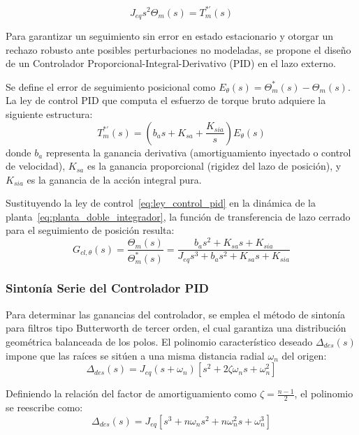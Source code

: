 \documentclass[10pt,a4paper]{article}
\begin{document}
\begin{equation}
    J_{eq} s^2 \Theta_m(s) = T_m^{*\prime}(s)
    \label{eq:planta_doble_integrador}
\end{equation}

Para garantizar un seguimiento sin error en estado estacionario y otorgar un rechazo robusto ante posibles perturbaciones no modeladas, se propone el diseño de un Controlador Proporcional-Integral-Derivativo (PID) en el lazo externo. 

Se define el error de seguimiento posicional como $E_\theta(s) = \Theta_m^*(s) - \Theta_m(s)$. La ley de control PID que computa el esfuerzo de torque bruto adquiere la siguiente estructura:
\begin{equation}
    T_m^{*\prime}(s) = \left( b_a s + K_{sa} + \frac{K_{sia}}{s} \right) E_\theta(s)
    \label{eq:ley_control_pid}
\end{equation}
donde $b_a$ representa la ganancia derivativa (amortiguamiento inyectado o control de velocidad), $K_{sa}$ es la ganancia proporcional (rigidez del lazo de posición), y $K_{sia}$ es la ganancia de la acción integral pura.

Sustituyendo la ley de control~\eqref{eq:ley_control_pid} en la dinámica de la planta~\eqref{eq:planta_doble_integrador}, la función de transferencia de lazo cerrado para el seguimiento de posición resulta:
\begin{equation}
    G_{cl,\theta}(s) = \frac{\Theta_m(s)}{\Theta_m^*(s)} = \frac{b_a s^2 + K_{sa} s + K_{sia}}{J_{eq} s^3 + b_a s^2 + K_{sa} s + K_{sia}}
    \label{eq:transferencia_lazo_cerrado_pid}
\end{equation}

\subsubsection{Sintonía Serie del Controlador PID}

Para determinar las ganancias del controlador, se emplea el método de sintonía para filtros tipo Butterworth de tercer orden, el cual garantiza una distribución geométrica balanceada de los polos. El polinomio característico deseado $\Delta_{des}(s)$ impone que las raíces se sitúen a una misma distancia radial $\omega_n$ del origen:
\begin{equation*}
    \Delta_{des}(s) = J_{eq} (s + \omega_n)\left[s^2 + 2\zeta \omega_n s + \omega_n^2\right]
\end{equation*}

Definiendo la relación del factor de amortiguamiento como $\zeta = \frac{n-1}{2}$, el polinomio se reescribe como:
\begin{equation}
    \Delta_{des}(s) = J_{eq} \left[ s^3 + n \omega_n s^2 + n \omega_n^2 s + \omega_n^3 \right]
    \label{eq:polinomio_deseado_pid}
\end{equation}
\end{document}
